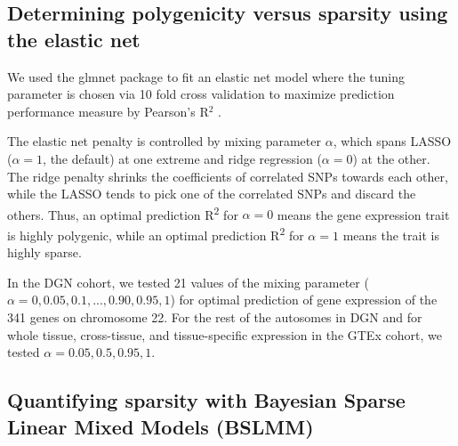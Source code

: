 \documentclass[10pt,letterpaper]{article}
\begin{document}
\subsection*{Determining polygenicity versus sparsity using the elastic
net}\label{determining-polygenicity-versus-sparsity-using-the-elastic-net}

We used the glmnet package to fit an elastic net model where the tuning parameter is chosen via 10 fold cross validation to maximize prediction performance measure by Pearson's R$^2$ \cite{Friedman_2010, Simon_2011}.


The elastic net penalty is controlled by mixing parameter \(\alpha\),
which spans LASSO (\(\alpha=1\), the default) \cite{Tibshirani_1996} at one extreme
and ridge regression (\(\alpha=0\)) \cite{Hoerl_1970} at the other. The ridge
penalty shrinks the coefficients of correlated SNPs towards each other,
while the LASSO tends to pick one of the correlated SNPs and discard the
others. Thus, an optimal prediction R\textsuperscript{2} for
\(\alpha=0\) means the gene expression trait is highly polygenic, while
an optimal prediction R\textsuperscript{2} for \(\alpha=1\) means the
trait is highly sparse. 

In the DGN cohort, we tested 21 values of the mixing parameter
(\(\alpha=0, 0.05, 0.1, ..., 0.90, 0.95, 1\)) for optimal prediction of
gene expression of the 341 genes on chromosome 22. For the rest of the
autosomes in DGN and for whole tissue, cross-tissue, and tissue-specific
expression in the GTEx cohort, we tested \(\alpha=0.05, 0.5, 0.95, 1\).

\subsection*{Quantifying sparsity with Bayesian Sparse Linear Mixed
Models
(BSLMM)}\label{quantifying-sparsity-with-bayesian-sparse-linear-mixed-models-bslmm}
\end{document}

